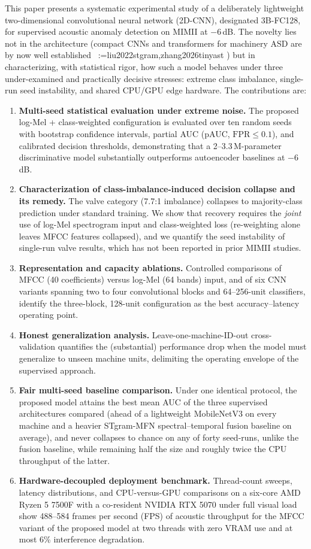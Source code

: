 \documentclass[review,nopreprintline]{elsarticle}
\makeatletter
\newif\ifmc@notfirst
\let\@oldcite\cite
\def\mc@splitcite#1{%
    \begingroup
    \mc@notfirstfalse
    \@for\@citekey:=#1\do{%
      \ifmc@notfirst, \fi
      \mc@notfirsttrue
      \@oldcite{\@citekey}%
    }%
    \endgroup
  }%
\def\cite#1{\protect\mc@splitcite{#1}}%
\makeatother
\begin{document}
This paper presents a systematic experimental study of a deliberately lightweight two-dimensional convolutional neural network (2D-CNN), designated 3B-FC128, for supervised acoustic anomaly detection on MIMII at $-6$\,dB. The novelty lies not in the architecture (compact CNNs and transformers for machinery ASD are by now well established~\cite{liu2022stgram,zhang2026tinyast}) but in characterizing, with statistical rigor, how such a model behaves under three under-examined and practically decisive stresses: extreme class imbalance, single-run seed instability, and shared CPU/GPU edge hardware. The contributions are:

\begin{enumerate}
\item \textbf{Multi-seed statistical evaluation under extreme noise.} The proposed log-Mel + class-weighted configuration is evaluated over ten random seeds with bootstrap confidence intervals, partial AUC (pAUC, $\mathrm{FPR}\le 0.1$), and calibrated decision thresholds, demonstrating that a 2--3.3\,M-parameter discriminative model substantially outperforms autoencoder baselines at $-6$\,dB.
\item \textbf{Characterization of class-imbalance-induced decision collapse and its remedy.} The valve category (7.7:1 imbalance) collapses to majority-class prediction under standard training. We show that recovery requires the \emph{joint} use of log-Mel spectrogram input and class-weighted loss (re-weighting alone leaves MFCC features collapsed), and we quantify the seed instability of single-run valve results, which has not been reported in prior MIMII studies.
\item \textbf{Representation and capacity ablations.} Controlled comparisons of MFCC (40 coefficients) versus log-Mel (64 bands) input, and of six CNN variants spanning two to four convolutional blocks and 64--256-unit classifiers, identify the three-block, 128-unit configuration as the best accuracy--latency operating point.
\item \textbf{Honest generalization analysis.} Leave-one-machine-ID-out cross-validation quantifies the (substantial) performance drop when the model must generalize to unseen machine units, delimiting the operating envelope of the supervised approach.
\item \textbf{Fair multi-seed baseline comparison.} Under one identical protocol, the proposed model attains the best mean AUC of the three supervised architectures compared (ahead of a lightweight MobileNetV3 on every machine and a heavier STgram-MFN spectral--temporal fusion baseline on average), and never collapses to chance on any of forty seed-runs, unlike the fusion baseline, while remaining half the size and roughly twice the CPU throughput of the latter.
\item \textbf{Hardware-decoupled deployment benchmark.} Thread-count sweeps, latency distributions, and CPU-versus-GPU comparisons on a six-core AMD Ryzen 5 7500F with a co-resident NVIDIA RTX 5070 under full visual load show 488--584 frames per second (FPS) of acoustic throughput for the MFCC variant of the proposed model at two threads with zero VRAM use and at most 6\% interference degradation.
\end{enumerate}
\end{document}
